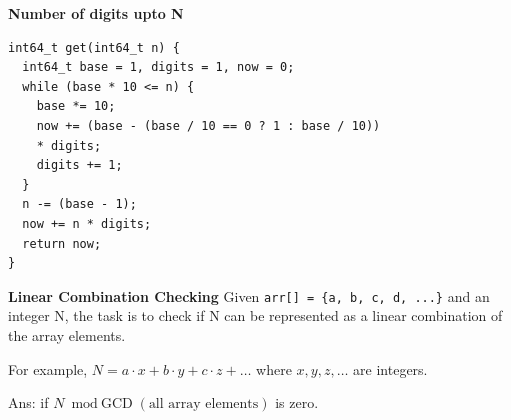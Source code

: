 \textbf{Number of digits upto N}
\begin{lstlisting}
int64_t get(int64_t n) {
  int64_t base = 1, digits = 1, now = 0;
  while (base * 10 <= n) {
    base *= 10;
    now += (base - (base / 10 == 0 ? 1 : base / 10))
    * digits;
    digits += 1;
  }
  n -= (base - 1);
  now += n * digits;
  return now;
}
\end{lstlisting}

\textbf{Linear Combination Checking}
Given \texttt{arr[] = \{a, b, c, d, ...\}} and an integer N, the task is to check if N can be represented as a linear combination of the array elements.

For example, $N = a \cdot x + b \cdot y + c \cdot z + \ldots$ where $x, y, z, \ldots$ are integers.

Ans: if $N \bmod \text{GCD}(\text{all array elements})$ is zero.
